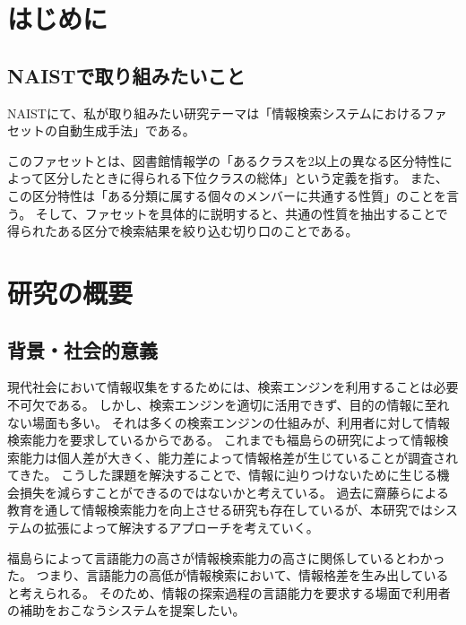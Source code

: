\documentclass[a4j,10pt, twocolumn]{jarticle} \usepackage[dvipdfmx]{graphicx} \usepackage{amssymb} \usepackage{amsmath}
\begin{document}
\section{はじめに}
\subsection{NAISTで取り組みたいこと}
NAISTにて、私が取り組みたい研究テーマは「情報検索システムにおけるファセットの自動生成手法」である。

このファセットとは、図書館情報学の「あるクラスを2以上の異なる区分特性によって区分したときに得られる下位クラスの総体\cite{libdic}」という定義を指す。
また、この区分特性は「ある分類に属する個々のメンバーに共通する性質」のことを言う。
そして、ファセットを具体的に説明すると、共通の性質を抽出することで得られたある区分で検索結果を絞り込む切り口のことである。
\section{研究の概要}
\subsection{背景・社会的意義}
 現代社会において情報収集をするためには、検索エンジンを利用することは必要不可欠である。
 しかし、検索エンジンを適切に活用できず、目的の情報に至れない場面も多い。
 それは多くの検索エンジンの仕組みが、利用者に対して情報検索能力を要求しているからである。
 これまでも福島らの研究によって情報検索能力は個人差が大きく、能力差によって情報格差が生じていることが調査されてきた\cite{fukushima}。
 こうした課題を解決することで、情報に辿りつけないために生じる機会損失を減らすことができるのではないかと考えている。
 過去に齋藤らによる教育を通して情報検索能力を向上させる研究\cite{saito}も存在しているが、本研究ではシステムの拡張によって解決するアプローチを考えていく。

 福島らによって言語能力の高さが情報検索能力の高さに関係しているとわかった\cite{fukushima}。
 つまり、言語能力の高低が情報検索において、情報格差を生み出していると考えられる。
 そのため、情報の探索過程の言語能力を要求する場面で利用者の補助をおこなうシステムを提案したい。
\end{document}
